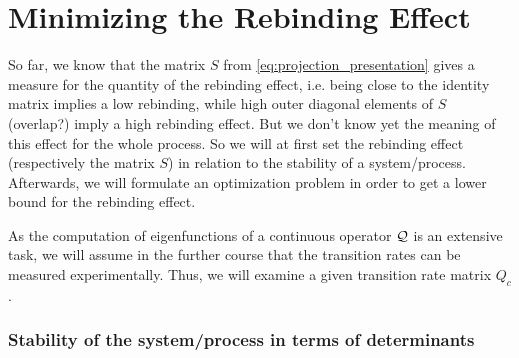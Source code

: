 \section{Minimizing the Rebinding Effect}
\label{sec:minimizing}

So far, we know that the matrix $S$ from \eqref{eq:projection_presentation} gives a measure for the quantity of the rebinding effect, i.e. being close to the identity matrix implies a low rebinding, while high outer diagonal elements of $S$ (overlap?) imply a high rebinding effect.
But we don't know yet the meaning of this effect for the whole process.
So we will at first set the rebinding effect (respectively the matrix $S$) in relation to the stability of a system/process.
Afterwards, we will formulate an optimization problem in order to get a lower bound for the rebinding effect.


As the computation of eigenfunctions of a continuous operator $\mathcal{Q}$ is an extensive task, we will assume in the further course that the transition rates can be measured experimentally.
Thus, we will examine a given transition rate matrix $Q_c$.


\subsubsection*{Stability of the system/process in terms of determinants}

